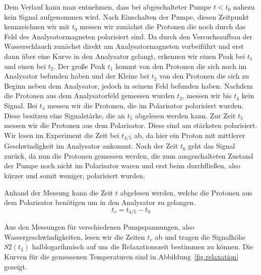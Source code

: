 \documentclass[paper=a4,
	fontsize=10pt,
	DIV=18,
	twocolumn,
	parskip=half
	]{scrartcl}
\numberwithin{equation}{section}    %
\begin{document}
Dem Verlauf kann man entnehmen, dass bei abgeschalteter Pumpe $t<t_0$ nahezu kein Signal aufgenommen wird. Nach Einschalten der Pumpe, diesen Zeitpunkt kennzeichnen wir mit $t_0$ messen wir zunächst die Protonen die noch durch das Feld des Analysatormagneten polarisiert sind. Da durch den Versuchsaufbau der Wasserschlauch zunächst direkt am Analysatormagneten vorbeiführt und erst dann über eine Kurve in den Analysator gelangt, erkennen wir einen Peak bei $t_1$ und einen bei $t_2$. Der große Peak $t_1$ kommt von den Protonen die sich noch im Analysator befunden haben und der Kleine bei $t_2$ von den Protonen die sich zu Beginn neben dem Analysator, jedoch in seinem Feld befunden haben. Nachdem die Protonen aus dem Analysatorfeld gemessen wurden $t_3$, messen wir bis $t_4$ kein Signal. Bei $t_4$ messen wir die Protonen, die im Polarisator polarisiert wurden. Diese besitzen eine Signalstärke, die an $t_5$ abgelesen werden kann. Zur Zeit $t_5$ messen wir die Protonen aus dem Polarisator. Diese sind am stärksten polarisiert. Wir lesen im Experiment die Zeit bei $t_{4/5}$ ab, da hier ein Proton mit mittlerer Geschwindigkeit im Analysator ankommt. Nach der Zeit $t_6$ geht das Signal zurück, da nun die Protonen gemessen werden, die zum ausgeschalteten Zustand der Pumpe noch nicht im Polarisator waren und erst beim durchfließen, also kürzer und somit weniger, polarisiert wurden.

Anhand der Messung kann die Zeit $t$ abgelesen werden, welche die Protonen aus dem Polarisator benötigen um in den Analysator zu gelangen.
\begin{equation}
	t_v = t_{4/5} - t_0
\end{equation}

Aus den Messungen für verschiedenen Pumpspannungen, also Wassergeschwindigkeiten, lesen wir die Zeiten $t_v$ ab und tragen die Signalhöhe $S2(t_5)$ halblogarihmisch auf um die Relaxationszeit bestimmen zu können. Die Kurven für die gemessenen Temperaturen sind in Abbildung~\ref{fig.relaxation} gezeigt.
\end{document}
